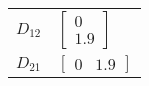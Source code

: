 \begin{tabular}{cl}
 $D_{12}$ & $\left[\begin{matrix}0\\1.9\end{matrix}\right]$                                                                                                                                                                                                                                                                                                                                                                                                                                                 \\
 $D_{21}$ & $\left[\begin{matrix}0 & 1.9\end{matrix}\right]$                                                                                                                                                                                                                                                                                                                                                                                                                                                \\
\hline
\end{tabular}